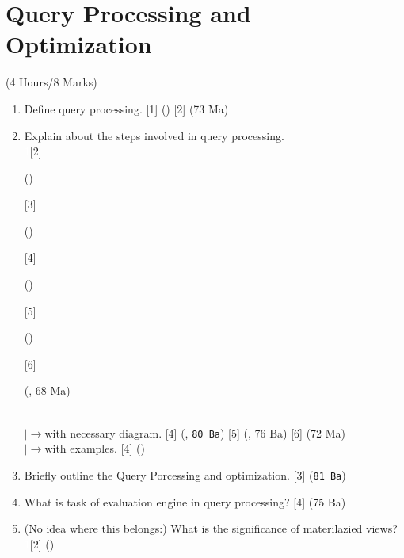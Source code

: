 \documentclass[12pt]{article}
\newcommand{\lb}{\\$\left|\rightarrow\right.$}
\newcommand{\enter}{\\\textcolor{white}{1}}
\begin{document}
\section{Query Processing and Optimization}
    \begin{center}(4 Hours/8 Marks)\end{center}
     \begin{enumerate}[noitemsep, topsep=0pt]
        	\item Define query processing. \hfill [1] () [2] (73 Ma)
        	
        \item Explain about the steps involved in query processing. 
        \enter\hfill [2] \begin{footnotesize}()\end{footnotesize} [3] \begin{footnotesize}()\end{footnotesize} [4] \begin{footnotesize}()\end{footnotesize} [5] \begin{footnotesize}()\end{footnotesize} [6] \begin{footnotesize}(, 68 Ma)\end{footnotesize}
        		\lb with necessary diagram. \hfill [4] (, \texttt{80 Ba}) [5] (, 76 Ba) [6] (72 Ma)
        		\lb with examples. \hfill [4] ()
            
     	\item Briefly outline the Query Porcessing and optimization. \hfill [3] (\texttt{81 Ba})
     	
     	\item What is task of evaluation engine in query processing? \hfill [4] (75 Ba)
     	
     	\item (No idea where this belongs:) What is the significance of materilazied views? 
     	\enter\hfill [2] ()
  	\end{enumerate}
        
\end{document}
